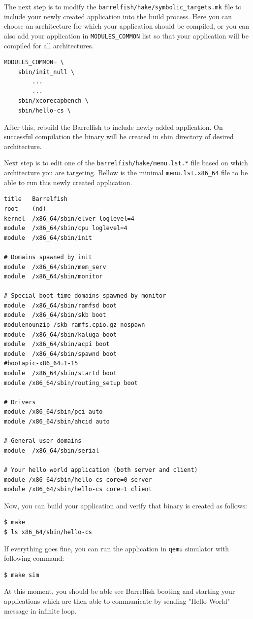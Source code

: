 The next step is to modify the \texttt{barrelfish/hake/symbolic\_targets.mk}
file to include your newly created application into the build process.
Here you can choose an architecture for which your application should be
compiled, or you can also add your application in \texttt{MODULES\_COMMON}
list so that your application will be compiled for all architectures.

\begin{verbatim}
MODULES_COMMON= \
	sbin/init_null \
        ...
        ...
	sbin/xcorecapbench \
	sbin/hello-cs \

\end{verbatim}

After this, rebuild the Barrelfish to include newly added application.  On
successful compilation the binary will be created in sbin directory of
desired architecture.


Next step is to edit one of the \texttt{barrelfish/hake/menu.lst.*} file based
on which architecture you are targeting.  Bellow is the minimal
\texttt{menu.lst.x86\_64} file to be able to run this newly created application.

\begin{verbatim}
title	Barrelfish
root	(nd)
kernel	/x86_64/sbin/elver loglevel=4
module	/x86_64/sbin/cpu loglevel=4
module	/x86_64/sbin/init

# Domains spawned by init
module	/x86_64/sbin/mem_serv
module	/x86_64/sbin/monitor

# Special boot time domains spawned by monitor
module  /x86_64/sbin/ramfsd boot
module  /x86_64/sbin/skb boot
modulenounzip /skb_ramfs.cpio.gz nospawn
module  /x86_64/sbin/kaluga boot
module  /x86_64/sbin/acpi boot
module  /x86_64/sbin/spawnd boot
#bootapic-x86_64=1-15
module  /x86_64/sbin/startd boot
module /x86_64/sbin/routing_setup boot

# Drivers
module /x86_64/sbin/pci auto
module /x86_64/sbin/ahcid auto

# General user domains
module	/x86_64/sbin/serial

# Your hello world application (both server and client)
module /x86_64/sbin/hello-cs core=0 server
module /x86_64/sbin/hello-cs core=1 client
\end{verbatim}

Now, you can build your application and verify that binary is created as
follows:

\begin{verbatim}
$ make
$ ls x86_64/sbin/hello-cs
\end{verbatim}

If everything goes fine, you can run the application in \texttt{qemu} simulator
with following command:
\begin{verbatim}
$ make sim
\end{verbatim}

At this moment, you should be able see Barrelfish booting and starting your
applications which are then able to communicate by sending "Hello World"
message in infinite loop.





